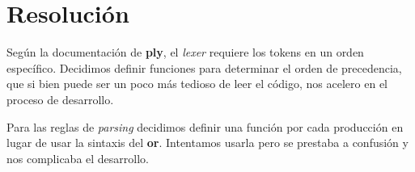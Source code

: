 \section{Resolución}

Según la documentación de \textbf{ply}, el \textit{lexer} requiere los tokens en un orden específico. Decidimos definir funciones para determinar el orden de precedencia, que si bien puede ser un poco más tedioso de leer el código, nos acelero en el proceso de desarrollo.



Para las reglas de \textit{parsing} decidimos definir una función por cada producción en lugar de usar la sintaxis del \textbf{or}. Intentamos usarla pero se prestaba a confusión y nos complicaba el desarrollo.  